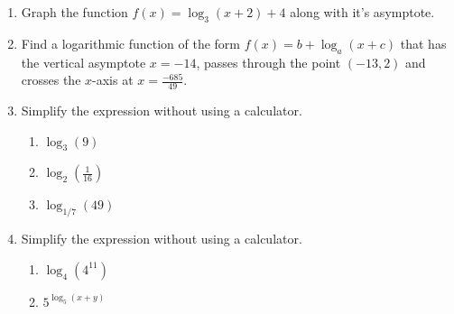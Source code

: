 \begin{enumerate}
\item Graph the function $f(x)=\log_{3}(x+2)+4$ along with it's asymptote.\\


\vfill
\item Find a logarithmic function of the form $f(x)=b+\log_{a}(x+c)$ that has the vertical asymptote $x=-14$, passes through the point $(-13, 2)$ and crosses the $x$-axis at $x=\frac{-685}{49}$.
\vfill
\vfill
\vfill

\clearpage



\item Simplify the expression without using a calculator.
\begin{enumerate}

\item $\log_3(9)$\\

\item $\displaystyle \log_2(\frac{1}{16})$\\

\item $\log_{1/7}(49)$\\



\end{enumerate}







\item Simplify the expression without using a calculator.
\begin{enumerate}

\item $\displaystyle \log_4(4^{11})$\\

\item $\displaystyle 5^{\log_5(x+y)}$\\


\end{enumerate}
\end{enumerate}
